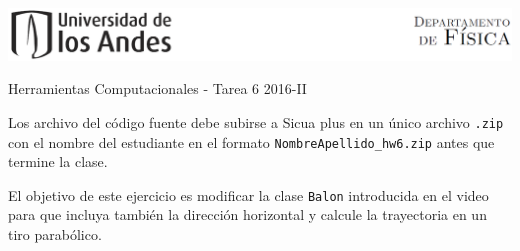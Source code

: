 \documentclass[11pt,letterpaper]{exam}
\begin{document}
\begin{center}

\includegraphics[width=16cm]{header.png}

\vspace{1.0cm}
{\Large Herramientas Computacionales - Tarea 6}
2016-II
\end{center}



\vspace{0.5cm}

\noindent
Los archivo del c\'odigo fuente debe subirse a Sicua plus en un \'unico archivo
\verb".zip" con el nombre del estudiante en el formato \verb"NombreApellido_hw6.zip" antes que termine la clase.

El objetivo de este ejercicio es modificar la clase \verb"Balon" introducida en el video para que incluya tambi\'en la direcci\'on horizontal y calcule la trayectoria en un tiro parab\'olico.

\vspace{0.5cm}
\end{document}
